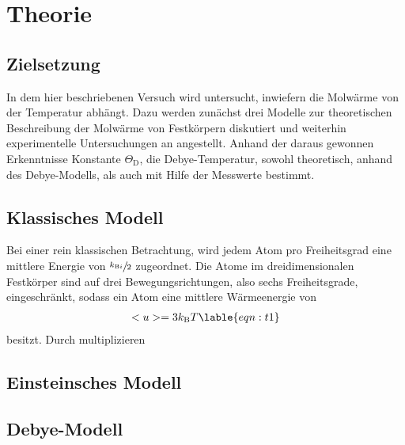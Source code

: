 \section{Theorie}
\label{sec:Theorie}

\subsection{Zielsetzung}
\label{subsec:zielsetzung}
In dem hier beschriebenen Versuch wird untersucht,
inwiefern die Molwärme von der Temperatur abhängt.
Dazu werden zunächst drei Modelle zur theoretischen Beschreibung
der Molwärme von Festkörpern diskutiert und weiterhin experimentelle
Untersuchungen an  angestellt.
Anhand der daraus gewonnen Erkenntnisse Konstante $\Theta_{\text{D}}$,
die Debye-Temperatur, sowohl theoretisch, anhand des Debye-Modells,
als auch mit Hilfe der Messwerte bestimmt.

\subsection{Klassisches Modell}
\label{subsec:klassisch}
Bei einer rein klassischen Betrachtung, wird jedem Atom pro Freiheitsgrad eine mittlere
Energie von $\sfrac{k_{\text{B}i}}{2}$ zugeordnet. Die Atome im dreidimensionalen
Festkörper sind auf drei Bewegungsrichtungen, also sechs Freiheitsgrade, eingeschränkt, sodass
ein Atom eine mittlere Wärmeenergie von
\begin{align}
	<u> = 3 k_{\text{B}} T \lable{eqn:t1}
\end{align}
besitzt. Durch multiplizieren

\subsection{Einsteinsches Modell}
\label{subsec:einstein}


\subsection{Debye-Modell}
\label{subsec:debye}




\cite{sample}

